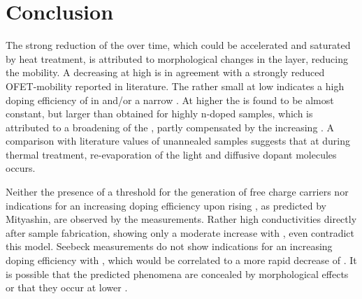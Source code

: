 \section{Conclusion}
%
The strong reduction of the \insitu \cLong over time, which could be accelerated and saturated by heat treatment, is attributed to morphological changes in the layer, reducing the mobility. A decreasing \cLong at high \CLongs is in agreement with a strongly reduced OFET-mobility reported in literature\cite{Harada2010,Kleemann2012a}.
%
The rather small \Es at low \CLongs indicates a high doping efficiency of \FV in \pen and/or a narrow \dosLong. At higher \CLongs the \Es is found to be almost constant, but larger than obtained for highly n-doped \CS samples, which is attributed to a broadening of the \dosLong, partly compensated by the increasing \CLong.
A comparison with literature values of unannealed samples suggests that at  during thermal treatment, re-evaporation of the light and diffusive dopant molecules occurs.

Neither the presence of a threshold \CLong for the generation of free charge carriers nor indications for an increasing doping efficiency upon rising \CLong, as predicted by Mityashin\etal\cite{Mityashin2012a}, are observed by the measurements.
Rather high conductivities directly after sample fabrication, showing only a moderate increase with \C, even contradict this model. Seebeck measurements do not show indications for an increasing doping efficiency with \C, which would be correlated to a more rapid decrease of \Es.
It is possible that the predicted phenomena are concealed by morphological effects or that they occur at lower \CLongs.

